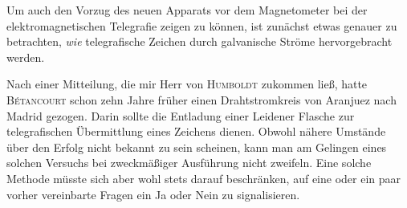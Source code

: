 Um auch den Vorzug des neuen Apparats vor dem Magnetometer bei der elektromagnetischen Telegrafie zeigen zu können, ist zunächst etwas genauer zu betrachten, \textit{wie} telegrafische Zeichen durch galvanische Ströme hervorgebracht werden.

\expandafter\def\csname HistoricalNoteText375\endcsname{Nach einer Mitteilung, die mir Herr von \textsc{Humboldt} zukommen ließ, hatte \textsc{Bétancourt} schon zehn Jahre früher einen Drahtstromkreis von Aranjuez nach Madrid gezogen. Darin sollte die Entladung einer Leidener Flasche zur telegrafischen Übermittlung eines Zeichens dienen. Obwohl nähere Umstände über den Erfolg nicht bekannt zu sein scheinen, kann man am Gelingen eines solchen Versuchs bei zweckmäßiger Ausführung nicht zweifeln. Eine solche Methode müsste sich aber wohl stets darauf beschränken, auf eine oder ein paar vorher vereinbarte Fragen ein Ja oder Nein zu signalisieren.}
